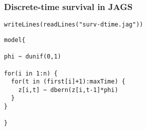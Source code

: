 \documentclass[color=usenames,dvipsnames]{beamer}\usepackage[]{graphicx}\usepackage[]{xcolor}
\makeatletter
\newcommand{\hlsng}[1]{\textcolor[rgb]{0.749,0.012,0.012}{#1}}%
\newcommand{\hldef}[1]{\textcolor[rgb]{0,0,0}{#1}}%
\newcommand{\hlkwd}[1]{\textcolor[rgb]{0.004,0.004,0.506}{#1}}%
\newenvironment{kframe}{%
 \def\at@end@of@kframe{}%
 \ifinner\ifhmode%
  \def\at@end@of@kframe{\end{minipage}}%
  \begin{minipage}{\columnwidth}%
 \fi\fi%
 \def\FrameCommand##1{\hskip\@totalleftmargin \hskip-\fboxsep
 \colorbox{shadecolor}{##1}\hskip-\fboxsep
     \hskip-\linewidth \hskip-\@totalleftmargin \hskip\columnwidth}%
 \MakeFramed {\advance\hsize-\width
   \@totalleftmargin\z@ \linewidth\hsize
   \@setminipage}}%
 {\par\unskip\endMakeFramed%
 \at@end@of@kframe}
\newenvironment{knitrout}{}{} %
\makeatother
\begin{document}
\begin{frame}[fragile]
  \frametitle{Discrete-time survival in JAGS}
\begin{knitrout}
\color{fgcolor}\begin{kframe}
\begin{alltt}
\hlkwd{writeLines}\hldef{(}\hlkwd{readLines}\hldef{(}\hlsng{"surv-dtime.jag"}\hldef{))}
\end{alltt}
\end{kframe}
\end{knitrout}
\begin{knitrout}
\color{fgcolor}\begin{kframe}
\begin{verbatim}
model{

phi ~ dunif(0,1)

for(i in 1:n) {
  for(t in (first[i]+1):maxTime) {
    z[i,t] ~ dbern(z[i,t-1]*phi)
  }
}

}
\end{verbatim}
\end{kframe}
\end{knitrout}
\end{frame}
\end{document}
